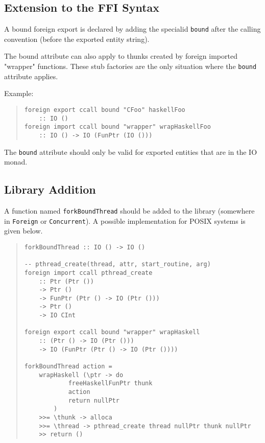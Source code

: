 \documentclass{article}
\begin{document}
\subsection{Extension to the FFI Syntax}

A bound foreign export is declared by adding the specialid \texttt{bound}
after the calling convention (before the exported entity string).

The bound attribute can also apply to thunks created by foreign imported
"wrapper" functions. These stub factories are the only situation where the
\texttt{bound} attribute applies. 

Example:
\begin{quote}
\begin{verbatim}
foreign export ccall bound "CFoo" haskellFoo
    :: IO ()
foreign import ccall bound "wrapper" wrapHaskellFoo
    :: IO () -> IO (FunPtr (IO ())) 
\end{verbatim}
\end{quote}

The \texttt{bound} attribute should only be valid for exported entities
that are in the IO monad.


\subsection{Library Addition}

A function named \texttt{forkBoundThread} should be added to the library
(somewhere in \texttt{Foreign} or \texttt{Concurrent}).
A possible implementation for POSIX systems is given below.

\begin{quote}
\begin{verbatim}
forkBoundThread :: IO () -> IO ()

-- pthread_create(thread, attr, start_routine, arg)
foreign import ccall pthread_create
    :: Ptr (Ptr ())
    -> Ptr ()
    -> FunPtr (Ptr () -> IO (Ptr ()))
    -> Ptr ()
    -> IO CInt

foreign export ccall bound "wrapper" wrapHaskell
    :: (Ptr () -> IO (Ptr ()))
    -> IO (FunPtr (Ptr () -> IO (Ptr ())))
    
forkBoundThread action =
    wrapHaskell (\ptr -> do
            freeHaskellFunPtr thunk
            action
            return nullPtr
        )
    >>= \thunk -> alloca
    >>= \thread -> pthread_create thread nullPtr thunk nullPtr
    >> return ()

\end{verbatim}
\end{quote}
\end{document}
